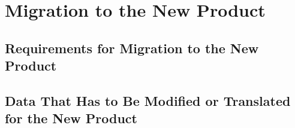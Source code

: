 \section{Migration to the New Product}
\subsection{Requirements for Migration to the New Product}
\subsection{Data That Has to Be Modified or Translated for the New Product}
